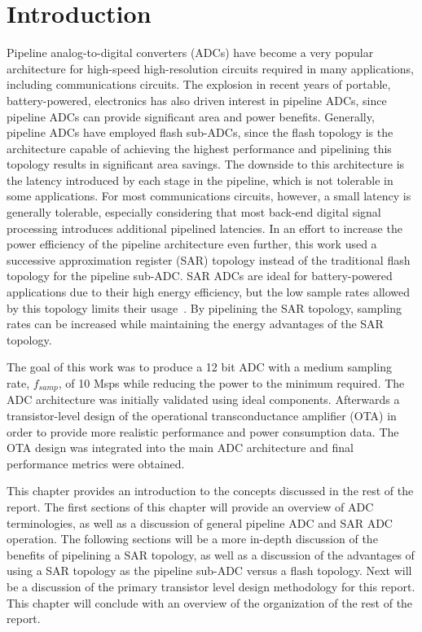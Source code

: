 \chapter{Introduction}
\label{chap:introduction}
Pipeline analog-to-digital converters (ADCs) have become a very popular architecture for high-speed high-resolution circuits required in many applications, including communications circuits. The explosion in recent years of 
portable, battery-powered, electronics has also driven interest in pipeline ADCs, since pipeline ADCs can provide significant area and power benefits. Generally, pipeline ADCs have employed flash sub-ADCs, since the flash 
topology is the architecture capable of achieving the highest performance and pipelining this topology results in significant area savings. The downside to this architecture is the latency introduced by each stage in the 
pipeline, which is not tolerable in some applications. For most communications circuits, however, a small latency is generally tolerable, especially considering that most back-end digital signal processing introduces 
additional pipelined latencies. In an effort to increase the power efficiency of the pipeline architecture even further, this work used a successive approximation register (SAR) topology instead of the traditional flash topology for the pipeline sub-ADC. SAR ADCs are ideal for battery-powered applications due to their high energy efficiency, but the low sample rates allowed by this 
topology limits their usage~\cite{maximsaradc}. By pipelining the SAR topology, sampling rates can be increased while maintaining the energy advantages of the SAR topology. 

The goal of this work was to produce a 12 bit ADC with a medium sampling rate, $f_{samp}$, of 10 Msps while reducing the power to the minimum required. The ADC architecture was initially validated using ideal components. Afterwards a transistor-level design of the operational transconductance amplifier (OTA) in order to provide more realistic performance and power consumption data. The OTA design was integrated into the main ADC architecture and final performance metrics were obtained. 

This chapter provides an introduction to the concepts discussed in the rest of the report. The first sections of this chapter will provide an overview of ADC terminologies, as well as a discussion of general pipeline ADC and SAR ADC operation. The following sections will be a more in-depth discussion of the benefits of pipelining a SAR topology, as well as a discussion of the advantages of using a SAR topology as the pipeline sub-ADC versus a flash topology. Next will be a discussion of the primary transistor level design methodology for this report. This chapter will conclude with an overview of the organization of the rest of the report.
